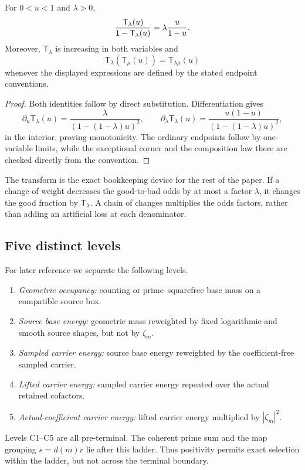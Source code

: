 \begin{lemma}
\label{lem:tpc54-odds}
For \(0<u<1\) and \(\lambda>0\),
\begin{equation}
 \frac{\mathsf T_{\lambda}\!\left(u\right)}{1-\mathsf T_{\lambda}\!\left(u\right)}
 =\lambda\frac{u}{1-u}.
 \label{eq:tpc54-odds}
\end{equation}
Moreover, \(\mathsf T_\lambda\) is increasing in both variables and
\begin{equation}
 \mathsf T_\lambda\!\left(\mathsf T_\mu(u)\right)
 =\mathsf T_{\lambda\mu}(u)
 \label{eq:tpc54-composition}
\end{equation}
whenever the displayed expressions are defined by the stated endpoint
conventions.
\end{lemma}

\begin{proof}
Both identities follow by direct substitution.  Differentiation gives
\[
 \partial_u\mathsf T_\lambda(u)
 =\frac{\lambda}{(1-(1-\lambda)u)^2},
 \qquad
 \partial_\lambda\mathsf T_\lambda(u)
 =\frac{u(1-u)}{(1-(1-\lambda)u)^2},
\]
in the interior, proving monotonicity.  The ordinary endpoints follow by
one-variable limits, while the exceptional corner and the composition law
there are checked directly from the convention.
\end{proof}

The transform is the exact bookkeeping device for the rest of the paper.
If a change of weight decreases the good-to-bad odds by at most a factor
\(\lambda\), it changes the good fraction by \(\mathsf T_\lambda\).  A
chain of changes multiplies the odds factors, rather than adding an
artificial loss at each denominator.

\subsection{Five distinct levels}

For later reference we separate the following levels.

\begin{enumerate}[label=\textup{(C\arabic*)},leftmargin=2.8em]
 \item \emph{Geometric occupancy:} counting or prime--squarefree base
       mass on a compatible source box.
 \item \emph{Source base energy:} geometric mass reweighted by fixed
       logarithmic and smooth source shapes, but not by \(\zeta_m\).
 \item \emph{Sampled carrier energy:} source base energy reweighted by
       the coefficient-free sampled carrier.
 \item \emph{Lifted carrier energy:} sampled carrier energy repeated over
       the actual retained cofactors.
 \item \emph{Actual-coefficient carrier energy:} lifted carrier energy
       multiplied by \(|\zeta_m|^2\).
\end{enumerate}

Levels C1--C5 are all pre-terminal.  The coherent prime sum and the map
grouping \(s=d(m)r\) lie after this ladder.  Thus positivity permits exact
selection within the ladder, but not across the terminal boundary.
